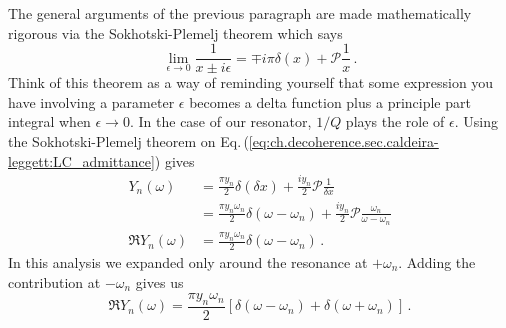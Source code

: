 The general arguments of the previous paragraph are made mathematically rigorous via the Sokhotski-Plemelj theorem which says
\begin{equation}
\lim_{\epsilon \rightarrow 0} \frac{1}{x \pm i \epsilon} = \mp i \pi \delta(x) + \mathcal{P} \frac{1}{x} \, .
\end{equation}
Think of this theorem as a way of reminding yourself that some expression you have involving a parameter $\epsilon$ becomes a delta function plus a principle part integral when $\epsilon \rightarrow 0$.
In the case of our resonator, $1/Q$ plays the role of $\epsilon$.
Using the Sokhotski-Plemelj theorem on Eq.\,(\ref{eq:ch.decoherence.sec.caldeira-leggett:LC_admittance}) gives
\begin{align}
Y_n(\omega)
&= \frac{\pi y_n}{2} \delta (\delta x) + \frac{i y_n}{2} \mathcal{P} \frac{1}{\delta x} \\
&= \frac{\pi y_n \omega_n}{2} \delta(\omega - \omega_n) + \frac{i y_n}{2} \mathcal{P} \frac{\omega_n}{\omega - \omega_n} \\
\Re Y_n(\omega)
&= \frac{\pi y_n \omega_n}{2} \delta(\omega - \omega_n) \, .
\end{align}
In this analysis we expanded only around the resonance at $+\omega_n$.
Adding the contribution at $-\omega_n$ gives us
\begin{equation}
\Re Y_n(\omega) = \frac{\pi y_n \omega_n}{2} \left[ \delta(\omega - \omega_n) + \delta(\omega + \omega_n) \right] \, . \label{eq:ch.decoherence.sec.caldeira-leggett:ReY_as_delta_functions}
\end{equation}

